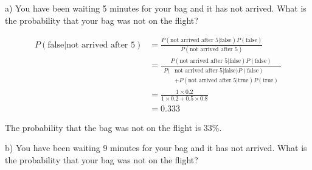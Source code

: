 \documentclass[
  letterpaper,
  DIV=11,
  numbers=noendperiod]{scrreprt}
\begin{document}
a) You have been waiting 5 minutes for your bag and it has not arrived.
What is the probability that your bag was not on the flight?

\begin{tcolorbox}[enhanced jigsaw, title=\textcolor{quarto-callout-tip-color}{\faLightbulb}\hspace{0.5em}{Answer}, toprule=.15mm, colback=white, breakable, titlerule=0mm, colframe=quarto-callout-tip-color-frame, coltitle=black, opacityback=0, rightrule=.15mm, colbacktitle=quarto-callout-tip-color!10!white, bottomtitle=1mm, opacitybacktitle=0.6, arc=.35mm, bottomrule=.15mm, toptitle=1mm, leftrule=.75mm, left=2mm]

\begin{align*}
P(\text{false}|\text{not arrived after 5})&=\frac{P(\text{not arrived after 5}|\text{false})P(\text{false})}{P(\text{not arrived after 5})} \\[12pt]
&=\frac{P(\text{not arrived after 5}|\text{false})P(\text{false})}{\begin{aligned}P(&\text{not arrived after 5}|\text{false})P(\text{false})\\&+P(\text{not arrived after 5}|\text{true})P(\text{true})\end{aligned}} \\[12pt]
&=\frac{1\times 0.2}{1\times 0.2+0.5\times 0.8} \\[12pt]
&=0.333
\end{align*}

The probability that the bag was not on the flight is 33\%.

\end{tcolorbox}

b) You have been waiting 9 minutes for your bag and it has not arrived.
What is the probability that your bag was not on the flight?
\end{document}
